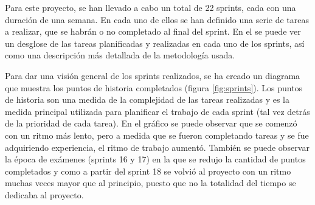 Para este proyecto, se han llevado a cabo un total de 22 sprints, cada con una duración de una semana.
En cada uno de ellos se han definido una serie de tareas a realizar, que se habrán o no completado al final
del sprint. En el \tercerAnexo se puede ver un desglose de las tareas planificadas y realizadas en cada
uno de los sprints, así como una descripción más detallada de la metodología usada.

Para dar una visión general de los sprints realizados, se ha creado un diagrama que muestra los puntos
de historia completados (figura \ref{fig:sprints}). Los puntos de historia son una medida de la
complejidad de las tareas realizadas y es la medida principal utilizada para planificar el trabajo de
cada sprint (tal vez detrás de la prioridad de cada tarea). En el gráfico se puede observar que se comenzó
con un ritmo más lento, pero a medida que se fueron completando tareas y se fue adquiriendo experiencia,
el ritmo de trabajo aumentó. También se puede observar la época de exámenes (sprints 16 y 17) en la que
se redujo la cantidad de puntos completados y como a partir del sprint 18 se volvió al proyecto con un
ritmo muchas veces mayor que al principio, puesto que no la totalidad del tiempo se dedicaba al proyecto.


